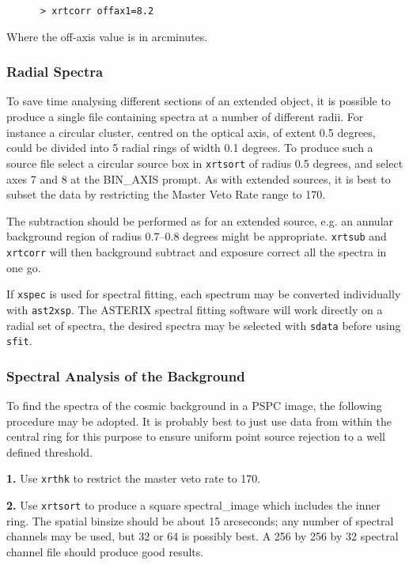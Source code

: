 \documentclass[11pt,fleqn]{article}    %
\begin{document}
\begin{verbatim}
      > xrtcorr offax1=8.2
\end{verbatim}

Where the off-axis value is in arcminutes.

\subsubsection{Radial Spectra}
To save time analysing different sections of an extended object, it is
possible to produce a single file containing spectra at a number of
different radii. For instance a circular cluster, centred on the optical
axis, of extent 0.5 degrees, could be divided into 5 radial rings 
of width 0.1 degrees. To produce such a source file select a circular source
box in {\tt xrtsort} of radius 0.5 degrees, and select axes 7 and 8 at the
BIN\_AXIS prompt. As with extended sources, it is best to subset the
data by restricting the Master Veto Rate range to 170.

The subtraction should be performed as for an extended source, e.g. an
annular background region of radius 0.7--0.8 degrees might be appropriate.
{\tt xrtsub} and {\tt xrtcorr} will then background subtract and exposure
correct all the spectra in one go. 

If {\tt xspec} is used for spectral fitting, each spectrum may be converted
individually with {\tt ast2xsp}. The ASTERIX spectral fitting software will
work directly on a radial set of spectra, the desired spectra may be
selected with {\tt sdata} before using {\tt sfit}.

\subsubsection{Spectral Analysis of the Background}
To find the spectra of the cosmic background in a PSPC image,
the following procedure may be adopted. It is probably best to just
use data from within the central ring for this purpose to ensure
uniform point source rejection to a well defined threshold.

{\bf 1.} Use {\tt xrthk} to restrict the master veto rate to 170. 

{\bf 2.} Use {\tt xrtsort} to produce a square spectral\_image which includes 
    the inner ring. The spatial binsize should be about 15 arcseconds;
    any number of spectral channels may be used, but 32 or 64 is
    possibly best. A 256 by 256 by 32 spectral channel file should
    produce good results.
\end{document}
